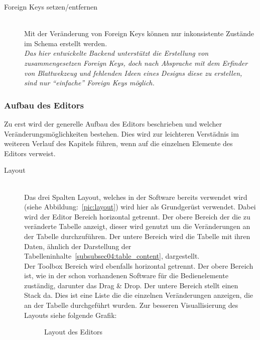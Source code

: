 \begin{description}
\item[Foreign Keys setzen/entfernen] \hfill\\
Mit der Veränderung von Foreign Keys können nur inkonsistente Zustände im Schema erstellt werden.\\
\textit{Das hier entwickelte Backend unterstützt die Erstellung von zusammengesetzen Foreign Keys, doch nach Absprache mit dem Erfinder von Blattwekzeug und fehlenden Ideen eines Designs diese zu erstellen, sind nur ``einfache'' Foreign Keys möglich.}  
\end{description}


\subsubsection{Aufbau des Editors}
\label{subsubsec04:editor_aufbau}

Zu erst wird der generelle Aufbau des Editors beschrieben und welcher Veränderungsmöglichkeiten bestehen. Dies wird zur leichteren Verstädnis im weiteren Verlauf des Kapitels führen, wenn auf die einzelnen Elemente des Editors verweist. 

\begin{description}
\item[Layout] \hfill\\
Das drei Spalten Layout, welches in der Software bereits verwendet wird (siehe Abbildung:~\ref{pic:layout}) wird hier als Grundgerüst verwendet. Dabei wird der Editor Bereich horizontal getrennt. Der obere Bereich der die zu veränderte Tabelle anzeigt, dieser wird genutzt um die Veränderungen an der Tabelle durchzuführen. Der untere Bereich wird die Tabelle mit ihren Daten, ähnlich der Darstellung der Tabelleninhalte~\ref{subsubsec04:table_content}, dargestellt. \\
Der Toolbox Bereich wird ebenfalls horizontal getrennt. Der obere Bereich ist, wie in der schon vorhandenen Software für die Bedienelemente zuständig, darunter das Drag \& Drop. Der untere Bereich stellt einen Stack da. Dies ist eine Liste die die einzelnen Veränderungen anzeigen, die an der Tabelle durchgeführt wurden.
Zur besseren Visuallisierung des Layouts siehe folgende Grafik:%

\begin{figure}[ht]
        \centering
        \caption{Layout des Editors}
        \label{pic:layout_editor}
\end{figure}
\end{description}

